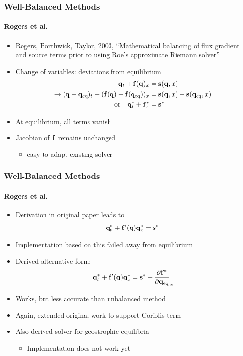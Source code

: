 \documentclass{beamer}
\begin{document}
\begin{frame}
  \frametitle{Well-Balanced Methods}
  \framesubtitle{Rogers et al.}
  \begin{itemize}
    \item Rogers, Borthwick, Taylor, 2003, ``Mathematical balancing of flux gradient and source terms prior to using Roe's approximate Riemann solver''
    \pause
    \item Change of variables: deviations from equilibrium
    \begin{align}
      \vb q_t + \vb f(\vb q)_x &= \vb s(\vb q, x) \\
      \to (\vb q - \vb q_\mathrm{eq})_t + (\vb f(\vb q) - \vb f(\vb q_\mathrm{eq}))_x &= \vb s(\vb q, x) - \vb s(\vb q_\mathrm{eq}, x) \\
      \mbox{or} \quad \vb q^*_t + \vb f^*_x &= \vb s^*
    \end{align}
    \pause
    \item At equilibrium, all terms vanish
    \pause
    \item Jacobian of $\vb f$ remains unchanged
    \begin{itemize}
      \item easy to adapt existing solver
    \end{itemize}
  \end{itemize}
\end{frame}

\begin{frame}
  \frametitle{Well-Balanced Methods}
  \framesubtitle{Rogers et al.}
  \begin{itemize}
    \item Derivation in original paper leads to
    \begin{equation}
      \vb q^*_t + \vb f'(\vb q) \vb q^*_x = \vb s^*
    \end{equation}
    \item Implementation based on this failed away from equilibrium
    \pause
    \item Derived alternative form:
    \begin{equation}
      \vb q^*_t + \vb f'(\vb q) \vb q^*_x = \vb s^* - \pdv{\vb f^*}{\vb q_\mathrm{eq}} (\vb q_\mathrm{eq})_x
    \end{equation}
    \item Works, but less accurate than unbalanced method
    \pause
    \item Again, extended original work to support Coriolis term
    \pause
    \item Also derived solver for geostrophic equilibria
    \begin{itemize}
      \item Implementation does not work yet
    \end{itemize}
  \end{itemize}
\end{frame}
\end{document}
